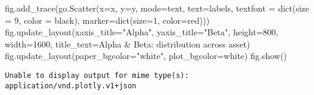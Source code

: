 \documentclass[
  letterpaper,
  DIV=11,
  numbers=noendperiod]{scrartcl}
\newenvironment{Shaded}{\begin{snugshade}}{\end{snugshade}}
\newcommand{\BuiltInTok}[1]{\textcolor[rgb]{0.00,0.23,0.31}{#1}}
\newcommand{\DecValTok}[1]{\textcolor[rgb]{0.68,0.00,0.00}{#1}}
\newcommand{\NormalTok}[1]{\textcolor[rgb]{0.00,0.23,0.31}{#1}}
\newcommand{\OperatorTok}[1]{\textcolor[rgb]{0.37,0.37,0.37}{#1}}
\newcommand{\StringTok}[1]{\textcolor[rgb]{0.13,0.47,0.30}{#1}}
\begin{document}
\begin{Shaded}
\begin{Highlighting}[]
\NormalTok{fig.add\_trace(go.Scatter(x}\OperatorTok{=}\NormalTok{x, y}\OperatorTok{=}\NormalTok{y, mode}\OperatorTok{=}\StringTok{\textquotesingle{}text\textquotesingle{}}\NormalTok{, text}\OperatorTok{=}\NormalTok{labels, textfont }\OperatorTok{=} \BuiltInTok{dict}\NormalTok{(size }\OperatorTok{=} \DecValTok{9}\NormalTok{, color }\OperatorTok{=} \StringTok{\textquotesingle{}black\textquotesingle{}}\NormalTok{), marker}\OperatorTok{=}\BuiltInTok{dict}\NormalTok{(size}\OperatorTok{=}\DecValTok{1}\NormalTok{, color}\OperatorTok{=}\StringTok{\textquotesingle{}red\textquotesingle{}}\NormalTok{)))}
\NormalTok{fig.update\_layout(xaxis\_title}\OperatorTok{=}\StringTok{"Alpha"}\NormalTok{, yaxis\_title}\OperatorTok{=}\StringTok{"Beta"}\NormalTok{, height}\OperatorTok{=}\DecValTok{800}\NormalTok{, width}\OperatorTok{=}\DecValTok{1600}\NormalTok{, title\_text}\OperatorTok{=}\StringTok{\textquotesingle{}Alpha \& Beta: distribution across asset\textquotesingle{}}\NormalTok{)}
\NormalTok{fig.update\_layout(paper\_bgcolor}\OperatorTok{=}\StringTok{"white"}\NormalTok{, plot\_bgcolor}\OperatorTok{=}\StringTok{\textquotesingle{}white\textquotesingle{}}\NormalTok{)}
\NormalTok{fig.show()}
\end{Highlighting}
\end{Shaded}

\begin{verbatim}
Unable to display output for mime type(s): application/vnd.plotly.v1+json
\end{verbatim}
\end{document}
